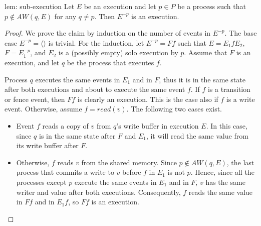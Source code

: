 \begin{lemma-repeat} {lem: sub-execution}
	Let $E$ be an execution and let $p \in P$ be a process such that $p \notin AW(q,E)$ for any $q \neq p$. Then $E^{-p}$ is an execution.
\end{lemma-repeat}

\begin{proof}
	We prove the claim by induction on the number of events in $E^{-p}$. The base case $E^{-p} = \langle \rangle$ is trivial. For the induction, let $E^{-p} = F f$ such that $E = E_1 f E_2$, $F = E_1^{-p}$, and $E_2$ is a (possibly empty) solo execution by $p$. Assume that $F$ is an execution, and let $q$ be the process that executes $f$.
	
	Process $q$ executes the same events in $E_1$ and in $F$, thus it is in the same state after both executions and about to execute the same event $f$. If $f$ is a transition or fence event, then $Ff$ is clearly an execution. This is the case also if $f$ is a write event. Otherwise, assume $f = read(v)$. The following two cases exist.
\begin{itemize}
\item Event $f$ reads a copy of $v$ from $q$'s write buffer in execution $E$. In this case, since $q$ is in the same state after $F$ and $E_1$, it will read the same value from its write buffer after $F$.
\item Otherwise, $f$ reads $v$ from the shared memory. Since $p \notin AW(q,E)$, the last process that commits a write to $v$ before $f$ in $E_1$ is not $p$. Hence, since all the processes except $p$ execute the same events in $E_1$ and in $F$, $v$ has the same writer and value after both executions. Consequently, $f$ reads the same value in $Ff$ and in $E_1 f$, so $Ff$ is an execution.
\end{itemize}
\end{proof}


